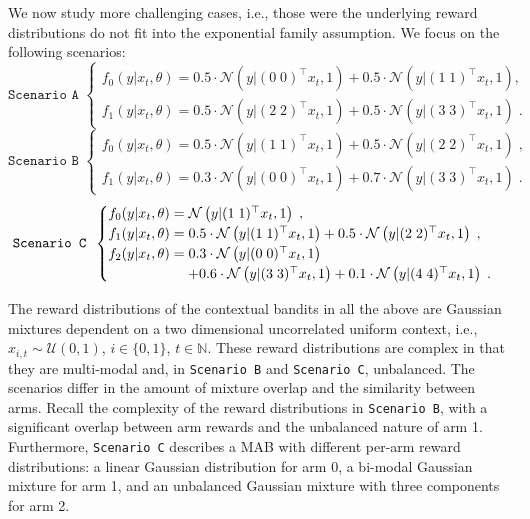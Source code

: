 \documentclass{article}
\def \Natural{{\mathbb N}}
\newcommand{\ie}{i.e., }
\newcommand{\N}[1]{\mathcal{N}\left( #1\right)}
\newcommand{\U}[1]{\mathcal{U}\left( #1\right)}
\begin{document}
We now study more challenging cases, \ie those were the underlying reward distributions do not fit into the exponential family assumption. We focus on the following scenarios:
\begin{equation}
\texttt{Scenario A }\begin{cases}
f_{0}(y|x_t,\theta) = 0.5 \cdot \N{y|(0 \; 0)^\top x_t , 1} + 0.5 \cdot \N{y|(1 \; 1)^\top x_t , 1},\\
f_{1}(y|x_t,\theta) = 0.5 \cdot \N{y|(2 \; 2)^\top x_t , 1} + 0.5 \cdot \N{y|(3 \; 3)^\top x_t , 1} \; .
\end{cases}
\label{eq:scenario_A}
\end{equation}
\begin{equation}
\texttt{Scenario B }\begin{cases}
f_{0}(y|x_t,\theta) = 0.5 \cdot \N{y|(1 \; 1)^\top x_t , 1} + 0.5 \cdot \N{y|(2 \; 2)^\top x_t , 1} \; ,\\
f_{1}(y|x_t,\theta) = 0.3 \cdot \N{y|(0 \; 0)^\top x_t , 1} + 0.7 \cdot \N{y|(3 \; 3)^\top x_t , 1} \; .
\end{cases}
\label{eq:scenario_B}
\end{equation}
\begin{equation}
\texttt{Scenario C }\begin{cases}
f_{0}(y|x_t,\theta) = \N{y|(1 \; 1)^\top x_t , 1}\; ,\\
f_{1}(y|x_t,\theta) = 0.5 \cdot \N{y|(1 \; 1)^\top x_t , 1} + 0.5 \cdot \N{y|(2 \; 2)^\top x_t , 1} \; ,\\
f_{2}(y|x_t,\theta) = 0.3 \cdot \N{y|(0 \; 0)^\top x_t , 1} \\
\hspace*{2cm}+ 0.6 \cdot \N{y|(3 \; 3)^\top x_t , 1} + 0.1 \cdot \N{y|(4 \; 4)^\top x_t , 1}\; .
\end{cases}
\label{eq:scenario_C}
\end{equation}

The reward distributions of the contextual bandits in all the above are Gaussian mixtures dependent on a two dimensional uncorrelated uniform context, \ie $x_{i,t}\sim\U{0,1}$, $i\in\{0,1\}$, $t\in \Natural$. These reward distributions are complex in that they are multi-modal and, in \texttt{Scenario B} and \texttt{Scenario C}, unbalanced. The scenarios differ in the amount of mixture overlap and the similarity between arms. Recall the complexity of the reward distributions in \texttt{Scenario B}, with a significant overlap between arm rewards and the unbalanced nature of arm 1. Furthermore, \texttt{Scenario C} describes a MAB with different per-arm reward distributions: a linear Gaussian distribution for arm 0, a bi-modal Gaussian mixture for arm 1, and an unbalanced Gaussian mixture with three components for arm 2.
\end{document}
